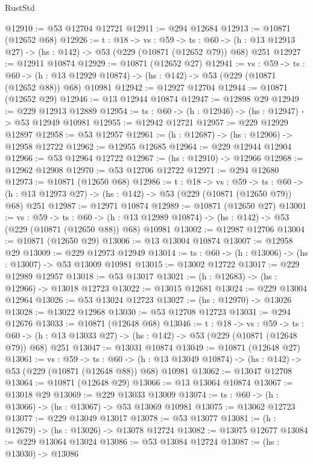 \begin{lexlean}{RustStd}
\begin{coremodule}
@12910 := @53 @12704 @12721
@12911 := @294 @12684
@12913 := @10871 (@12652 @68)
@12926 := {t : @18} ->
  {vs : @59} ->
  {ts : @60} -> (h : @13 @12913 @27) -> (hs : @142) -> @53 (@229 (@10871 (@12652 @79)) @68) @251
@12927 := @12911 @10874
@12929 := @10871 (@12652 @27)
@12941 := {vs : @59} ->
  {ts : @60} ->
  (h : @13 @12929 @10874) -> (hs : @142) -> @53 (@229 (@10871 (@12652 @88)) @68) @10981
@12942 := @12927 @12704
@12944 := @10871 (@12652 @29)
@12946 := @13 @12944 @10874
@12947 := @12898 @29
@12949 := @229 @12913 @12889
@12954 := {ts : @60} -> (h : @12946) -> (hs : @12947) -> @53 @12949 @10981
@12955 := @12942 @12721
@12957 := @229 @12929 @12897
@12958 := @53 @12957
@12961 := (h : @12687) -> (hs : @12906) -> @12958 @12722
@12962 := @12955 @12685
@12964 := @229 @12944 @12904
@12966 := @53 @12964 @12722
@12967 := (hs : @12910) -> @12966
@12968 := @12962 @12908
@12970 := @53 @12706 @12722
@12971 := @294 @12680
@12973 := @10871 (@12650 @68)
@12986 := {t : @18} ->
  {vs : @59} ->
  {ts : @60} -> (h : @13 @12973 @27) -> (hs : @142) -> @53 (@229 (@10871 (@12650 @79)) @68) @251
@12987 := @12971 @10874
@12989 := @10871 (@12650 @27)
@13001 := {vs : @59} ->
  {ts : @60} ->
  (h : @13 @12989 @10874) -> (hs : @142) -> @53 (@229 (@10871 (@12650 @88)) @68) @10981
@13002 := @12987 @12706
@13004 := @10871 (@12650 @29)
@13006 := @13 @13004 @10874
@13007 := @12958 @29
@13009 := @229 @12973 @12949
@13014 := {ts : @60} -> (h : @13006) -> (hs : @13007) -> @53 @13009 @10981
@13015 := @13002 @12722
@13017 := @229 @12989 @12957
@13018 := @53 @13017
@13021 := (h : @12683) -> (hs : @12966) -> @13018 @12723
@13022 := @13015 @12681
@13024 := @229 @13004 @12964
@13026 := @53 @13024 @12723
@13027 := (hs : @12970) -> @13026
@13028 := @13022 @12968
@13030 := @53 @12708 @12723
@13031 := @294 @12676
@13033 := @10871 (@12648 @68)
@13046 := {t : @18} ->
  {vs : @59} ->
  {ts : @60} -> (h : @13 @13033 @27) -> (hs : @142) -> @53 (@229 (@10871 (@12648 @79)) @68) @251
@13047 := @13031 @10874
@13049 := @10871 (@12648 @27)
@13061 := {vs : @59} ->
  {ts : @60} ->
  (h : @13 @13049 @10874) -> (hs : @142) -> @53 (@229 (@10871 (@12648 @88)) @68) @10981
@13062 := @13047 @12708
@13064 := @10871 (@12648 @29)
@13066 := @13 @13064 @10874
@13067 := @13018 @29
@13069 := @229 @13033 @13009
@13074 := {ts : @60} -> (h : @13066) -> (hs : @13067) -> @53 @13069 @10981
@13075 := @13062 @12723
@13077 := @229 @13049 @13017
@13078 := @53 @13077
@13081 := (h : @12679) -> (hs : @13026) -> @13078 @12724
@13082 := @13075 @12677
@13084 := @229 @13064 @13024
@13086 := @53 @13084 @12724
@13087 := (hs : @13030) -> @13086

\end{coremodule}
\end{lexlean}
